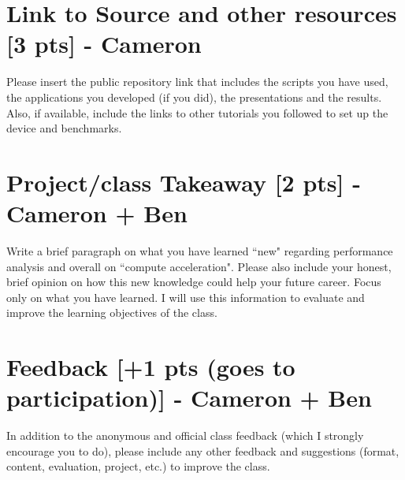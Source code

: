 \documentclass[sigconf,authorversion,nonacm]{acmart}
\begin{document}
\section{Link to Source and other resources {\small {[3 pts]}} - Cameron} 
Please insert the public repository link that includes the scripts you have used, the applications you developed (if you did), the presentations and the results. Also, if available, include the links to other tutorials you followed to set up the device and benchmarks.

\section{Project/class Takeaway {\small {[2 pts]}} - Cameron + Ben}  
Write a brief paragraph on what you have learned ``new" regarding performance analysis and overall on ``compute acceleration". Please also include your honest, brief opinion on how this new knowledge could help your future career. Focus only on what you have learned. I will use this information to evaluate and improve the learning objectives of the class. 


\section{Feedback {\small {[+1 pts (goes to participation)]}} - Cameron + Ben}  
In addition to the anonymous and official class feedback (which I strongly encourage you to do), please include any other feedback and suggestions (format, content, evaluation, project, etc.) to improve the class.




\end{document}
